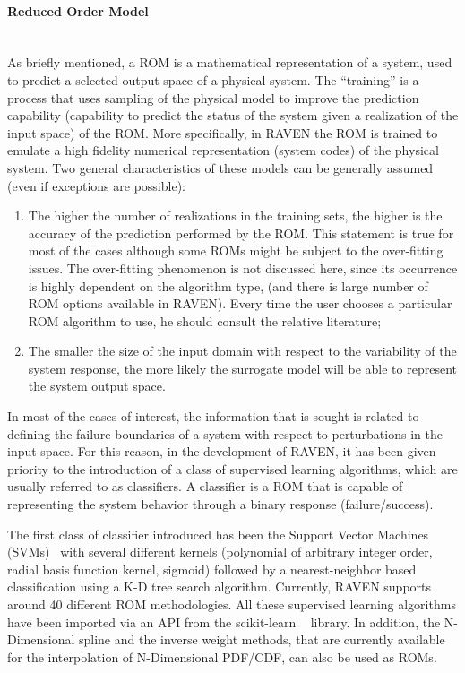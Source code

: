 \paragraph{Reduced Order Model} ~\\
 As briefly mentioned, a ROM is a mathematical representation of a system, used to predict a selected output space of a physical system.
The ``training'' is a process that uses sampling of the physical model to improve the prediction capability (capability to predict the status of the system given a realization of the input space) of the ROM. More specifically, in RAVEN the ROM is trained to emulate a high fidelity numerical representation (system codes) of the physical system. Two general characteristics of these models can be generally assumed (even if exceptions are possible):
\begin{enumerate}
   \item The higher the number of realizations in the training sets, the higher is the accuracy of the prediction performed by the
   ROM. This statement is true for most of the cases although some ROMs might be subject to the over-fitting issues. The over-fitting
   phenomenon is not discussed here, since its occurrence is highly dependent on the algorithm type, (and there is large number of
   ROM options available in RAVEN). Every time the user chooses a particular ROM algorithm to use, he should consult the relative
   literature;
   \item The smaller the size of the input domain with respect to the variability of the system response, the more likely the surrogate
   model will be able to represent the system output space.
\end{enumerate}

In most of the cases of interest, the information that is sought is related to defining the failure boundaries of a system with respect to perturbations in the input space. For this reason, in the development of RAVEN, it has been given priority to the introduction of a class of supervised learning algorithms, which are usually referred to as classifiers. A classifier is a ROM that is capable of representing the system behavior through a binary response (failure/success).

The first class of classifier introduced has been the Support Vector Machines (SVMs)~\cite{SVM_Burges} with several different kernels (polynomial of arbitrary integer order, radial basis function kernel, sigmoid) followed by a nearest-neighbor based classification using a K-D tree search algorithm. Currently, RAVEN supports around 40 different ROM methodologies. All these supervised learning algorithms have been imported via an API from the scikit-learn ~\cite{SciKitLearn} library. In addition, the N-Dimensional spline and the inverse weight methods, that are currently available for the interpolation of N-Dimensional PDF/CDF, can also be used as ROMs.


